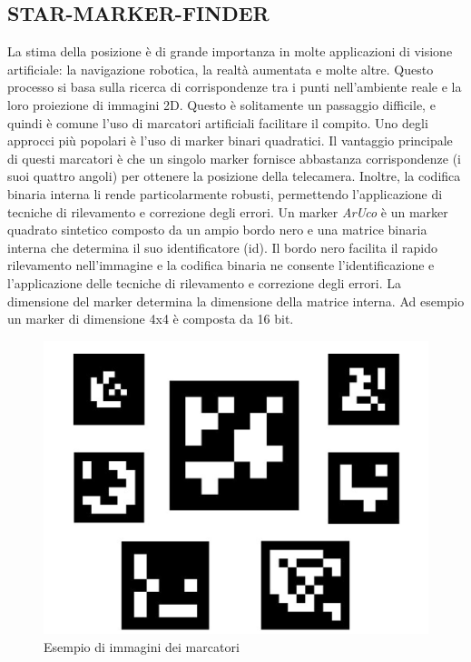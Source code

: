 \documentclass[a4paper]{article}
\begin{document}
\subsection{STAR-MARKER-FINDER}
La stima della posizione è di grande importanza in molte applicazioni di visione artificiale: la navigazione robotica, la realtà aumentata e molte altre. Questo processo si basa sulla ricerca di corrispondenze tra i punti nell'ambiente reale e la loro proiezione di immagini 2D. Questo è solitamente un passaggio difficile, e quindi è comune l'uso di marcatori artificiali facilitare il compito.
Uno degli approcci più popolari è l'uso di marker binari quadratici. Il vantaggio principale di questi marcatori è che un singolo marker fornisce abbastanza corrispondenze (i suoi quattro angoli) per ottenere la posizione della telecamera. Inoltre, la codifica binaria interna li rende particolarmente robusti, permettendo l'applicazione di tecniche di rilevamento e correzione degli errori.
Un marker \textit{ArUco} è un marker quadrato sintetico composto da un ampio bordo nero e una matrice binaria interna che determina il suo identificatore (id). Il bordo nero facilita il rapido rilevamento nell'immagine e la codifica binaria ne consente l'identificazione e l'applicazione delle tecniche di rilevamento e correzione degli errori. La dimensione del marker determina la dimensione della matrice interna. Ad esempio un marker di dimensione 4x4 è composta da 16 bit.

\begin{figure}[htbp]
\centering
\includegraphics[scale=0.5]{marker_img.PNG} 
\caption{Esempio di immagini dei marcatori}
\end{figure}
\end{document}
